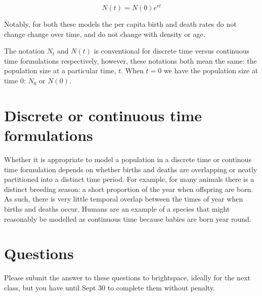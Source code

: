 \documentclass[]{book}
\begin{document}
\begin{equation}
N(t) = N(0)e^{rt}
\label{eq:Exp}
\end{equation}

Notably, for both these models the per capita birth and death rates do
not change change over time, and do not change with density or age.

The notation \(N_t\) and \(N(t)\) is conventional for discrete time
versus continuous time formulations respectively, however, these
notations both mean the same: the population size at a particular time,
\(t\). When \(t=0\) we have the population size at time 0: \(N_0\) or
\(N(0)\).

\section{Discrete or continuous time
formulations}\label{discrete-or-continuous-time-formulations}

Whether it is appropriate to model a population in a discrete time or
continous time formulation depends on whether births and deaths are
overlapping or neatly partitioned into a distinct time period. For
example, for many animals there is a distinct breeding season: a short
proportion of the year when offspring are born. As such, there is very
little temporal overlap between the times of year when births and deaths
occur. Humans are an example of a species that might reasonably be
modelled as continuous time because babies are born year round.

\section{Questions}\label{questions-6}

Please submit the answer to these questions to brightspace, ideally for
the next class, but you have until Sept 30 to complete them without
penalty.
\end{document}
